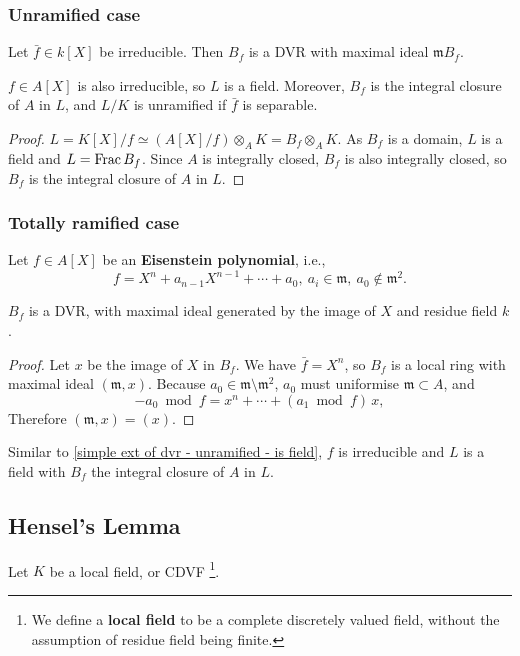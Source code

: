 \subsubsection*{Unramified case}
Let $\bar{f}\in k[X]$ be irreducible. Then $B_f$ is a DVR with maximal ideal $\mathfrak{m}B_f$.
\begin{corollary}\label{simple ext of dvr - unramified - is field}
    $f\in A[X]$ is also irreducible, so $L$ is a field.
    Moreover, $B_f$ is the integral closure of $A$ in $L$, and $L/K$ is unramified if $\bar{f}$ is separable.
\end{corollary}
\begin{proof}
    $L = K[X]/f \simeq \left( A[X]/f \right)\otimes_{A} K = B_f\otimes_A K$.
    As $B_f$ is a domain, $L$ is a field and $L = \operatorname{Frac} B_f$.
    Since $A$ is integrally closed, $B_f$ is also integrally closed, so $B_f$ is the integral closure of $A$ in $L$.
\end{proof}
\subsubsection*{Totally ramified case}
Let $f\in A[X]$ be an \textbf{Eisenstein polynomial}, i.e., \[f = X^n + a_{n-1}X^{n-1} + \cdots  + a_0,\ a_i\in\mathfrak{m},\ a_0\notin\mathfrak{m}^2.\]
\begin{proposition}
    $B_f$ is a DVR, with maximal ideal generated by the image of $X$ and residue field $k$.
\end{proposition}
\begin{proof}
    Let $x$ be the image of $X$ in $B_f$.
    We have $\bar{f} = X^n$, so $B_f$ is a local ring with maximal ideal $(\mathfrak{m}, x)$.
    Because $a_0\in\mathfrak{m\setminus m^2}$, $a_0$ must uniformise $\mathfrak{m}\subset A$, and \[-a_0\bmod f = x^n + \cdots + (a_1\bmod f)\,x,\] Therefore $(\mathfrak{m}, x) = (x)$.
\end{proof}
Similar to \cref{simple ext of dvr - unramified - is field}, $f$ is irreducible and $L$ is a field with $B_f$ the integral closure of $A$ in $L$.

\subsection{Hensel's Lemma}
Let $K$ be a local field, or CDVF
\footnote{We define a \textbf{local field} to be a complete discretely valued field, without the assumption of residue field being finite.}.

